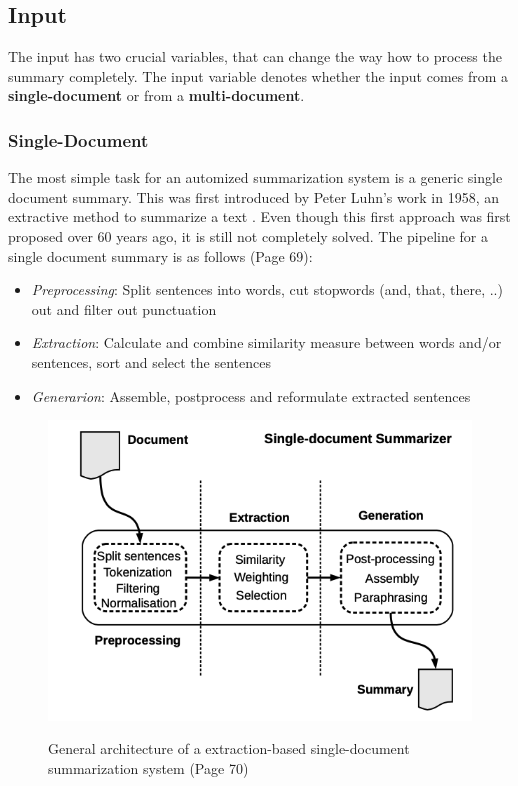 \subsection{Input}\label{ss:input}

The input has two crucial variables, that can change the way how to process the summary completely. The input variable denotes whether the input comes from a \textbf{single-document} or from a \textbf{multi-document}. 

\subsubsection{Single-Document}\label{ss:sd}
The most simple task for an automized summarization system is a generic single document summary. This was first introduced by Peter Luhn's work in 1958, an extractive method to summarize a text \cite{textmining1958}.  Even though this first approach was first proposed over 60 years ago, it is still not completely solved. The pipeline for a single document summary is as follows \cite{juan} (Page 69):

\begin{itemize}
	\item \textit{Preprocessing}: Split sentences into words, cut stopwords (and, that, there, ..) out and filter out punctuation 
	\item \textit{Extraction}: Calculate and combine similarity measure between words and/or sentences, sort and select the sentences
	\item \textit{Generarion}: Assemble, postprocess and reformulate extracted sentences
\end{itemize}

\begin{figure}
	\begin{center}
		\includegraphics[width=4.5in]{photos/single_doc}\\
		\caption{General architecture of a extraction-based single-document summarization system \cite{juan} (Page 70)}\label{single}
	\end{center}
\end{figure}

